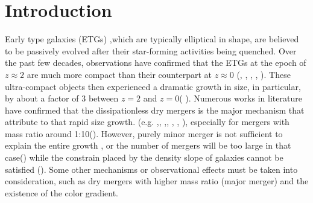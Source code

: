 \documentclass[fleqn,usenatbib]{mnras}
\begin{document}
\section{Introduction}
\par Early type galaxies (ETGs) ,which are typically elliptical in shape, are believed to be passively evolved after their star-forming activities being quenched. Over the past few decades, observations have confirmed that the ETGs at the epoch of $z \approx 2 $ are much more compact than their counterpart at $z \approx 0$ (\cite{daddiPassivelyEvolvingEarlyType2005}, \cite{toft2007}, \cite{trujillo2006}, \cite{trujillo2007}, \cite{vandokkum2008}). These ultra-compact objects then experienced a dramatic growth in size, in particular, by about a factor of 3 between $z = 2 $ and $ z = 0$( \cite{damjanov2019, fan_dramatic_2008, hamadouche2022, vanderwel3DHSTCANDELSEvolution2014, van_dokkum_growth_2010}). 
Numerous  works in literature have confirmed that the dissipationless dry mergers is the major mechanism that attribute to that rapid size growth. 
(e.g.  \cite{naab_minor_2009},\cite{van_dokkum_2010_hubble}, \cite{oser_cosmological_2011},\cite{newman2012},  \cite{hilz_how_2013}, \cite{dekel_wet_2014}, \cite{deugenio2023}), especially for mergers with mass ratio around 1:10(\cite{newman2012,Belli_2015}). However, purely minor merger is not sufficient to explain the entire growth , or the number of mergers will be too large in that case(\cite{hopkins_discriminating_2010,nipoti2009}) while the constrain placed by the density slope of galaxies cannot be satisfied (\cite{sonnenfeld2014}). Some other mechanisms or observational effects must be taken into consideration, such as dry mergers with higher mass ratio (major merger) and the existence of the color gradient. 
\end{document}
